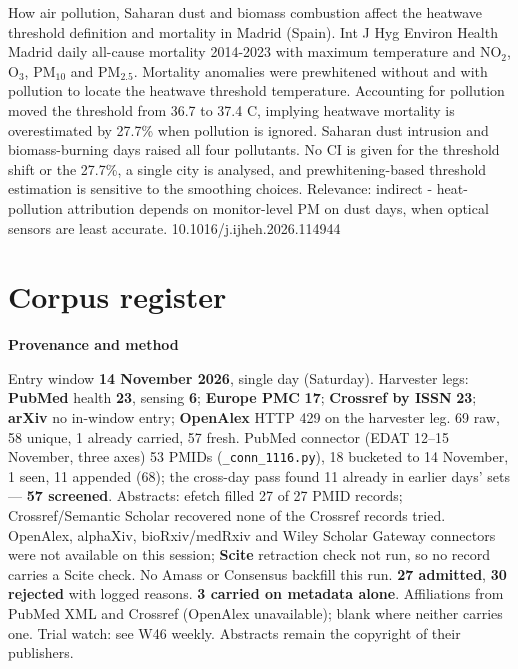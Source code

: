 \documentclass[10pt]{article}
\begin{document}
{How air pollution, Saharan dust and biomass combustion affect the heatwave threshold definition and mortality in Madrid (Spain).}
{Int J Hyg Environ Health}
{Madrid daily all-cause mortality 2014-2023 with maximum temperature and NO$_2$, O$_3$, PM$_{10}$ and PM$_{2.5}$. Mortality anomalies were prewhitened without and with pollution to locate the heatwave threshold temperature. Accounting for pollution moved the threshold from 36.7 to 37.4 C, implying heatwave mortality is overestimated by 27.7\% when pollution is ignored. Saharan dust intrusion and biomass-burning days raised all four pollutants. No CI is given for the threshold shift or the 27.7\%, a single city is analysed, and prewhitening-based threshold estimation is sensitive to the smoothing choices. Relevance: indirect - heat-pollution attribution depends on monitor-level PM on dust days, when optical sensors are least accurate.}
{10.1016/j.ijheh.2026.114944}

\clearpage
\section*{\sffamily\bfseries\color{Deep}Corpus register}
\vspace{-1.5mm}{\color{Amber}\rule{\linewidth}{1.1pt}}\vspace{2.5mm}



\vspace{2mm}

\begin{keybox}
{\sffamily\bfseries\footnotesize\color{Deep}Provenance and method}\\[1.2mm]
{\fontsize{7.2}{8.8}\selectfont
Entry window \textbf{14 November 2026}, single day (Saturday). Harvester legs: \textbf{PubMed} health \textbf{23}, sensing \textbf{6}; \textbf{Europe PMC} \textbf{17}; \textbf{Crossref by ISSN} \textbf{23}; \textbf{arXiv} no in-window entry; \textbf{OpenAlex} HTTP 429 on the harvester leg. 69 raw, 58 unique, 1 already carried, 57 fresh. PubMed connector (EDAT 12--15 November, three axes) 53 PMIDs (\texttt{\_conn\_1116.py}), 18 bucketed to 14 November, 1 seen, 11 appended (68); the cross-day pass found 11 already in earlier days' sets --- \textbf{57 screened}. Abstracts: efetch filled 27 of 27 PMID records; Crossref/Semantic Scholar recovered none of the Crossref records tried.
OpenAlex, alphaXiv, bioRxiv/medRxiv and Wiley Scholar Gateway connectors were not available on this session; \textbf{Scite} retraction check not run, so no record carries a Scite check. No Amass or Consensus backfill this run.
\textbf{27 admitted}, \textbf{30 rejected} with logged reasons. \textbf{3 carried on metadata alone}. Affiliations from PubMed XML and Crossref (OpenAlex unavailable); blank where neither carries one. Trial watch: see W46 weekly.
Abstracts remain the copyright of their publishers.\par}
\end{keybox}
\end{document}

